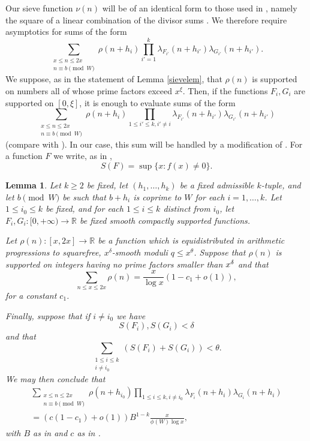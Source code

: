 \documentclass[12pt]{amsart}
\theoremstyle{plain}
\newtheorem{lem}{Lemma}
\theoremstyle{definition}
\numberwithin{equation}{section}
\newcommand{\twosum}[2]{\sum_{\substack{#1\\#2}}}
\newcommand{\R}{\mathbb R}
\begin{document}
Our sieve function $\nu(n)$ will be of an identical form to those used in \cite{polymath8b}, namely the square of a linear combination of the divisor sums \cite[(16)]{polymath8b}. We therefore require asymptotics for sums of the form 
$$\twosum{x\leq n\leq 2x}{n\equiv b\pmod W}\rho(n+h_i)\prod_{i'=1}^k\lambda_{F_{i'}}(n+h_{i'})\lambda_{G_{i'}}(n+h_{i'}).$$ 
We suppose, as in the statement of Lemma \ref{sievelem}, that $\rho(n)$ is supported on numbers all of whose prime factors exceed $x^\xi$. Then, if the functions $F_i,G_i$ are supported on $[0,\xi]$, it is enough to evaluate sums of the form  
$$\twosum{x\leq n\leq 2x}{n\equiv b\pmod W}\rho(n+h_i)\prod_{1\leq i'\leq k,i'\ne i}\lambda_{F_{i'}}(n+h_{i'})\lambda_{G_{i'}}(n+h_{i'})$$ 
(compare with \cite[(21)]{polymath8b}).  In our case, this sum will be handled by a modification of \cite[Theorem 3.5]{polymath8b}.  For a function $F$ we write, as in \cite{polymath8b},
$$S(F)=\sup\{x:f(x)\ne 0\}.$$

\begin{lem}
Let $k \geq 2$ be fixed, let $(h_1,\dots,h_k)$ be a fixed admissible $k$-tuple, and let $b\pmod W$ be such that $b+h_i$ is coprime to $W$ for each $i=1,\dots,k$.  Let $1 \leq i_0 \leq k$ be fixed, and for each $1 \leq i \leq k$ distinct from $i_0$, let $F_{i}, G_{i}: [0,+\infty) \to \R$ be fixed smooth compactly supported functions.

Let $\rho(n):[x,2x]\rightarrow \R$ be a function which is equidistributed in arithmetic progressions to squarefree, $x^\delta$-smooth moduli $q\leq x^\theta$.  Suppose that $\rho(n)$ is supported on integers having no prime factors smaller than $x^\delta$ and that 
$$\sum_{n\leq x\leq 2x}\rho(n)=\frac{x}{\log x}(1-c_1+o(1)),$$
for a constant $c_1$.

Finally, suppose that if $i\ne i_0$ we have 
$$S(F_i),S(G_i)<\delta$$
and that 
$$\twosum{1\leq i\leq k}{i\ne i_0}(S(F_i)+S(G_i))<\theta.$$
We may then conclude that 
\begin{equation*}
\begin{split}
\twosum{x\leq n\leq 2x}{n\equiv b\pmod W}\rho(n+h_{i_0})\prod_{1\leq i\leq k,i\ne i_0}\lambda_{F_i}(n+h_i)\lambda_{G_i}(n+h_i)\\
=(c(1-c_1)+o(1))B^{1-k}\frac{x}{\phi(W)\log x},
\end{split}
\end{equation*}
with $B$ as in \cite[(12)]{polymath8b} and $c$ as in \cite[Theorem 3.5]{polymath8b}.  
\end{lem}
\end{document}
